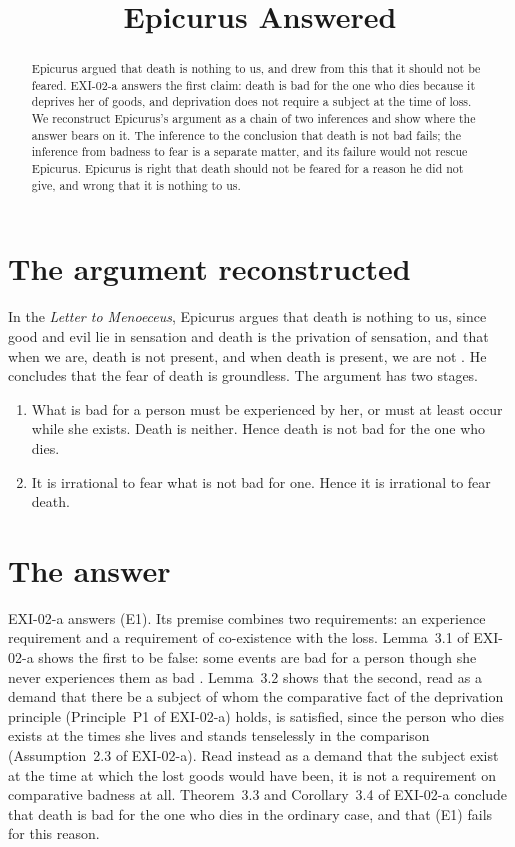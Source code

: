 \documentclass{situationist-preprint}
\title{Epicurus Answered}
\begin{document}
\maketitle

\begin{abstract}
Epicurus argued that death is nothing to us, and drew from this that it should not be feared. EXI-02-a answers the first claim: death is bad for the one who dies because it deprives her of goods, and deprivation does not require a subject at the time of loss. We reconstruct Epicurus's argument as a chain of two inferences and show where the answer bears on it. The inference to the conclusion that death is not bad fails; the inference from badness to fear is a separate matter, and its failure would not rescue Epicurus. Epicurus is right that death should not be feared for a reason he did not give, and wrong that it is nothing to us.
\end{abstract}

\section{The argument reconstructed}

In the \emph{Letter to Menoeceus}, Epicurus argues that death is nothing to us, since good and evil lie in sensation and death is the privation of sensation, and that when we are, death is not present, and when death is present, we are not \citep{EpicurusMen}. He concludes that the fear of death is groundless. The argument has two stages.

\begin{enumerate}
\item[(E1)] What is bad for a person must be experienced by her, or must at least occur while she exists. Death is neither. Hence death is not bad for the one who dies.
\item[(E2)] It is irrational to fear what is not bad for one. Hence it is irrational to fear death.
\end{enumerate}

\section{The answer}

EXI-02-a answers (E1). Its premise combines two requirements: an experience requirement and a requirement of co-existence with the loss. Lemma~3.1 of EXI-02-a shows the first to be false: some events are bad for a person though she never experiences them as bad \citep{Nagel1970}. Lemma~3.2 shows that the second, read as a demand that there be a subject of whom the comparative fact of the deprivation principle (Principle~P1 of EXI-02-a) holds, is satisfied, since the person who dies exists at the times she lives and stands tenselessly in the comparison (Assumption~2.3 of EXI-02-a). Read instead as a demand that the subject exist at the time at which the lost goods would have been, it is not a requirement on comparative badness at all. Theorem~3.3 and Corollary~3.4 of EXI-02-a conclude that death is bad for the one who dies in the ordinary case, and that (E1) fails for this reason.
\end{document}
